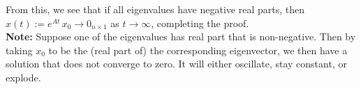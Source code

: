 From this, we see that if all eigenvalues have negative real parts, then $x(t):=e^{At}\, x_0 \to 0_{n \times 1}$ as $t \to  \infty$, completing the proof. \\

\textbf{Note:} Suppose one of the eigenvalues has real part that is non-negative. Then by taking $x_0$ to be the (real part of) the corresponding eigenvector, we then have a solution that does not converge to zero. It will either oscillate, stay constant, or explode. 

\Qed





